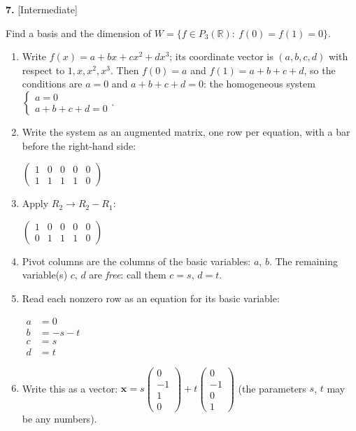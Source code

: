 \documentclass[11pt]{article}
\begin{document}
\par\vspace{2pt}
\begin{minipage}{\linewidth}\textbf{7.} \hfill{\scriptsize\color{ink}[Intermediate]}\par\nopagebreak Find a basis and the dimension of $W=\{f\in P_3(\mathbb{R}):\ f(0)=f(1)=0\}$.
\end{minipage}\par\nopagebreak
\begin{tcolorbox}[breakable,colback=ans,colframe=ansb,boxrule=0.5pt,left=4pt,right=4pt,top=2pt,bottom=2pt]\begin{enumerate}[leftmargin=3.1em,itemsep=1pt,topsep=1pt,label=\textbf{Step \arabic*.}]\item Write $f(x)=a+bx+cx^{2}+dx^{3}$; its coordinate vector is $(a,b,c,d)$ with respect to $1,x,x^{2},x^{3}$. Then $f(0)=a$ and $f(1)=a+b+c+d$, so the conditions are $a=0$ and $a+b+c+d=0$: the homogeneous system $\begin{cases}a=0\\ a+b+c+d=0\end{cases}$.
\item Write the system as an augmented matrix, one row per equation, with a bar before the right-hand side:\par\smallskip $\displaystyle \left(\begin{array}{cccc|c}1 & 0 & 0 & 0 & 0 \\ 1 & 1 & 1 & 1 & 0\end{array}\right)$
\item Apply $R_2\to R_2-R_1$:\par\smallskip $\displaystyle \left(\begin{array}{cccc|c}1 & 0 & 0 & 0 & 0 \\ 0 & 1 & 1 & 1 & 0\end{array}\right)$
\item Pivot columns are the columns of the basic variables: $a$, $b$. The remaining variable(s) $c$, $d$ are \emph{free}: call them $c=s$, $d=t$.
\item Read each nonzero row as an equation for its basic variable:\par\smallskip $\displaystyle\begin{aligned}a&=0\\ b&=-s-t\\ c&=s\\ d&=t\end{aligned}$
\item Write this as a vector: $\displaystyle \mathbf x=s\begin{pmatrix}0\\-1\\1\\0\end{pmatrix}+t\begin{pmatrix}0\\-1\\0\\1\end{pmatrix}$ (the parameters $s$, $t$ may be any numbers).

\end{enumerate}
\end{tcolorbox}
\end{document}
